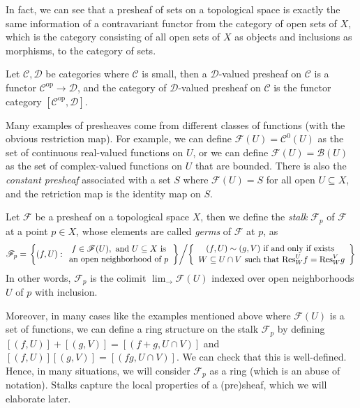 \documentclass[11pt]{book}
\begin{document}
In fact, we can see that a presheaf of sets on a topological space is exactly the same information of a contravariant functor from the category of open sets of $X$, which is the category consisting of all open sets of $X$ as objects and inclusions as morphisms, to the category of sets. 
\begin{definitionbox}
Let $\mathcal{C},\mathcal{D}$ be categories where $\mathcal{C}$ is small, then a $\mathcal{D}$-valued presheaf on $\mathcal{C}$ is a functor $\mathcal{C}^{\mathrm{op}}\rightarrow\mathcal{D}$, and the category of $\mathcal{D}$-valued presheaf on $\mathcal{C}$ is the functor category $[\mathcal{C}^{\mathrm{op}},\mathcal{D}]$.
\end{definitionbox}

Many examples of presheaves come from different classes of functions (with the obvious restriction map). For example, we can define $\mathscr{F}(U)=\mathscr{C}^0(U)$ as the set of continuous real-valued functions on $U$, or we can define $\mathscr{F}(U)=\mathscr{B}(U)$ as the set of complex-valued functions on $U$ that are bounded. There is also the \textit{constant presheaf} associated with a set $S$ where $\mathscr{F}(U)=S$ for all open $U\subseteq X$, and the retriction map is the identity map on $S$.
\begin{definition}Let $\mathscr{F}$ be a presheaf on a topological space $X$, then we define the \textit{stalk} $\mathscr{F}_p$ of $\mathscr{F}$ at a point $p\in X$, whose elements are called \textit{germs} of $\mathscr{F}$ at $p$, as
\[\mathscr{F}_p=\left.\left\{(f,U):\begin{array}{c}f\in\mathscr{F}(U),\textrm{\ and\ }U\subseteq X\textrm{\ is}\\\textrm{an\ open\ neighborhood\ of\ }p\end{array}\right\} \middle/ \left\{\begin{array}{c}(f,U)\sim (g,V)\textrm{\ if\ and\ only\ if\ exists\ }\\W\subseteq U\cap V\textrm{\ such\ that\ }\mathrm{Res}^U_Wf=\mathrm{Res}^V_Wg\end{array}\right\}\right.\]
In other words, $\mathscr{F}_p$ is the colimit $\displaystyle\lim_{\longrightarrow}\mathscr{F}(U)$ indexed over open neighborhoods $U$ of $p$ with inclusion.
\end{definition}
Moreover, in many cases like the examples mentioned above where $\mathscr{F}(U)$ is a set of functions, we can define a ring structure on the stalk $\mathscr{F}_p$ by defining $[(f,U)]+[(g,V)]=[(f+g,U\cap V)]$ and $[(f,U)][(g,V)]=[(fg,U\cap V)]$. We can check that this is well-defined. Hence, in many situations, we will consider $\mathscr{F}_p$ as a ring (which is an abuse of notation). Stalks capture the local properties of a (pre)sheaf, which we will elaborate later.
\end{document}
